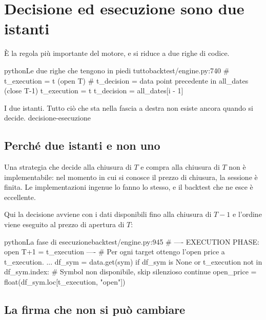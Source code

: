 \section{Decisione ed esecuzione sono due istanti}\label{sez:decisione-esecuzione}

È la regola più importante del motore, e si riduce a due righe di codice.

\begin{codiceInterno}{python}{Le due righe che tengono in piedi tutto}{backtest/engine.py:740}
            # t_execution = t (open T)
            # t_decision = data point precedente in all_dates (close T-1)
            t_execution = t
            t_decision = all_dates[i - 1]
\end{codiceInterno}

  {I due istanti. Tutto ciò che sta nella fascia a destra non esiste ancora
   quando si decide.}
  {decisione-esecuzione}

\subsection{Perché due istanti e non uno}

Una strategia che decide alla chiusura di $T$ e compra alla chiusura di $T$
non è implementabile: nel momento in cui si conosce il prezzo di chiusura, la
sessione è finita. Le implementazioni ingenue lo fanno lo stesso, e il
backtest che ne esce è eccellente.

Qui la decisione avviene con i dati disponibili fino alla chiusura di $T-1$ e
l'ordine viene eseguito al prezzo di apertura di $T$:

\begin{codiceInterno}{python}{La fase di esecuzione}{backtest/engine.py:945}
            # ---- EXECUTION PHASE: open T+1 = t_execution ----
            # Per ogni target ottengo l'open price a t_execution.
            ...
                df_sym = data.get(sym)
                if df_sym is None or t_execution not in df_sym.index:
                    # Symbol non disponibile, skip silenzioso
                    continue
                open_price = float(df_sym.loc[t_execution, "open"])
\end{codiceInterno}

\subsection{La firma che non si può cambiare}


